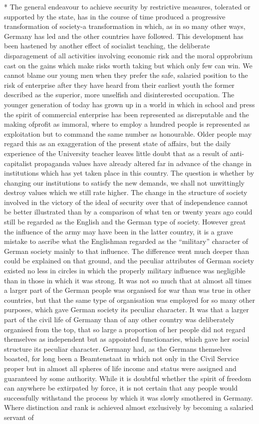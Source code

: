 \documentclass[11pt,openany]{book}
\begin{document}
* The general endeavour to achieve security by restrictive measures, tolerated or supported by the state, has in the course of time produced a progressive transformation of society-a transformation in which, as in so many other ways, Germany has led and the other countries have followed. This development has been hastened by another effect of socialist teaching, the deliberate disparagement of all activities involving economic risk and the moral opprobrium cast on the gains which make risks worth taking but which only few can win. We cannot blame our young men when they prefer the safe, salaried position to the risk of enterprise after they have heard from their earliest youth the former described as the superior, more unselfish and disinterested occupation. The younger generation of today has grown up in a world in which in school and press the spirit of commercial enterprise has been represented as disreputable and the making ofprofit as immoral, where to employ a hundred people is represented as exploitation but to command the same number as honourable. Older people may regard this as an exaggeration of the present state of affairs, but the daily experience of the University teacher leaves little doubt that as a result of anti-capitalist propaganda values have already altered far in advance of the change in institutions which has yet taken place in this country. The question is whether by changing our institutions to satisfy the new demands, we shall not unwittingly destroy values which we still rate higher. The change in the structure of society involved in the victory of the ideal of security over that of independence cannot be better illustrated than by a comparison of what ten or twenty years ago could still be regarded as the English and the German type of society. However great the influence of the army may have been in the latter country, it is a grave mistake to ascribe what the Englishman regarded as the ``military'' character of German society mainly to that influence. The difference went much deeper than could be explained on that ground, and the peculiar attributes of German society existed no less in circles in which the properly military influence was negligible than in those in which it was strong. It was not so much that at almost all times a larger part of the German people was organised for war than was true in other countries, but that the same type of organisation was employed for so many other purposes, which gave German society its peculiar character. It was that a larger part of the civil life of Germany than of any other country was deliberately organised from the top, that so large a proportion of her people did not regard themselves as independent but as appointed functionaries, which gave her social structure its peculiar character. Germany had, as the Germans themselves boasted, for long been a Beamtenstaat in which not only in the Civil Service proper but in almost all spheres of life income and status were assigned and guaranteed by some authority. While it is doubtful whether the spirit of freedom can anywhere be extirpated by force, it is not certain that any people would successfully withstand the process by which it was slowly smothered in Germany. Where distinction and rank is achieved almost exclusively by becoming a salaried servant of 
\end{document}
